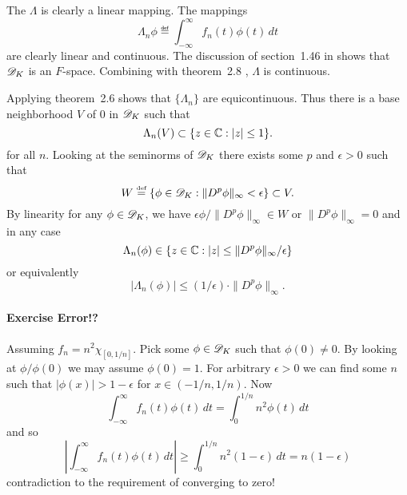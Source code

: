 \begin{enumerate}
The \(\Lambda\) is clearly a linear mapping.
The mappings 
\begin{equation*}
\Lambda_n \phi \eqdef \int_{-\infty}^\infty f_n(t)\phi(t)\,dt
\end{equation*}
are clearly
linear and continuous. The discussion of section~1.46 in \cite{RudinFA79}
shows that \(\mathscr{D}_K\) is an $F$-space. Combining with 
theorem~2.8 \cite{RudinFA79}, \(\Lambda\) is continuous.

Applying theorem~2.6 \cite{RudinFA79} shows that \(\{\Lambda_n\}\)
are equicontinuous. Thus there is a base neighborhood $V$ of $0$ in \(\mathscr{D}_K\)
such that
\begin{equation*}
\Lambda_n(V) \subset \{z\in\mathbb{C}: |z|\leq 1\}.
\end{equation*}
for all $n$. Looking at the seminorms of \(\mathscr{D}_K\)
there exists some $p$ and \(\epsilon > 0\) such that 
\begin{equation*}
W \stackrel{\mbox{\upshape\tiny def}}{=} \{\phi\in\mathscr{D}_K: \|D^p \phi\|_\infty < \epsilon\} \subset V.
\end{equation*}
By linearity for any \(\phi \in \mathscr{D}_K\), we have 
\(\epsilon\phi/\|D^p \phi\|_\infty \in W\) or 
\(\|D^p \phi\|_\infty = 0\) and in any case
\begin{equation*}
\Lambda_n(\phi) \in \{z\in\mathbb{C}: |z|\leq \|D^p \phi\|_\infty/\epsilon\}
\end{equation*}
or equivalently
\begin{equation*}
|\Lambda_n(\phi)| \leq  (1/\epsilon)\cdot \|D^p \phi\|_\infty.
\end{equation*}

\paragraph{Exercise Error!?} 
Assuming \(f_n = n^2\chi_{[0,1/n]}\). Pick some \(\phi\in\mathscr{D}_K\)
such that \(\phi(0)\neq 0\). By looking at \(\phi/\phi(0)\)
we may assume \(\phi(0)=1\). For arbitrary \(\epsilon>0\)
we can find some $n$ such that \(|\phi(x)| > 1 - \epsilon\)
for \(x\in (-1/n,1/n)\). Now
\begin{equation*}
      \int_{-\infty}^{\infty} f_n(t)\phi(t)\,dt
 =  \int_0^{1/n} n^2\phi(t)\,dt
\end{equation*}
and so 
\begin{equation*}
      \left|\int_{-\infty}^{\infty} f_n(t)\phi(t)\,dt\right|
 \geq  \int_0^{1/n} n^2(1-\epsilon)\,dt = n(1-\epsilon) 
\end{equation*}
contradiction to the requirement of converging to zero!



\end{enumerate}
